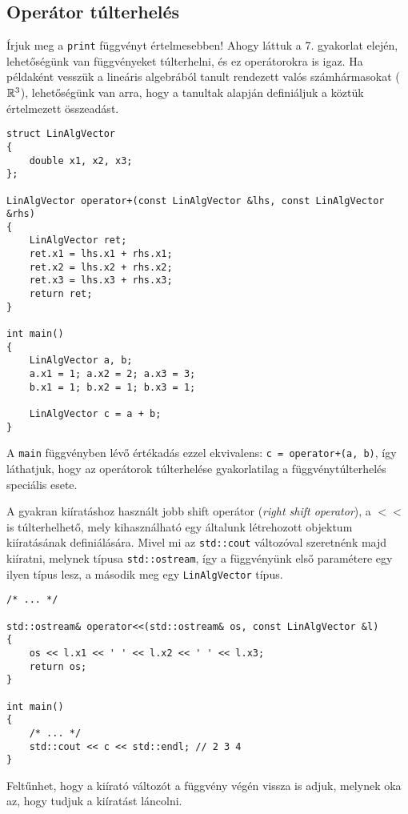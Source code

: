 \documentclass[a4paper,11.5pt]{article}
\begin{document}
	\subsection{Operátor túlterhelés}
	Írjuk meg a \texttt{print} függvényt értelmesebben! Ahogy láttuk a 7. gyakorlat elején, lehetőségünk van függvényeket túlterhelni, és ez operátorokra is igaz. Ha példaként vesszük a lineáris algebrából tanult rendezett valós számhármasokat ($\mathbb{R}^3$), lehetőségünk van arra, hogy a tanultak alapján definiáljuk a köztük értelmezett összeadást.
	\begin{lstlisting}
struct LinAlgVector
{
	double x1, x2, x3;
};

LinAlgVector operator+(const LinAlgVector &lhs, const LinAlgVector &rhs)
{
	LinAlgVector ret;
	ret.x1 = lhs.x1 + rhs.x1;
	ret.x2 = lhs.x2 + rhs.x2; 
	ret.x3 = lhs.x3 + rhs.x3;
	return ret;
}

int main()
{
	LinAlgVector a, b;
	a.x1 = 1; a.x2 = 2; a.x3 = 3;
	b.x1 = 1; b.x2 = 1; b.x3 = 1;
	
	LinAlgVector c = a + b; 
}
	\end{lstlisting}
	A \texttt{main} függvényben lévő értékadás ezzel ekvivalens: \texttt{c = operator+(a, b)}, így láthatjuk, hogy az operátorok túlterhelése gyakorlatilag a függvénytúlterhelés speciális esete. 
	\smallskip 
	
	A gyakran kiíratáshoz használt jobb shift operátor (\textit{right shift operator}), a $<<$ is túlterhelhető, mely kihasználható egy általunk létrehozott objektum kiíratásának definiálására. Mivel mi az \texttt{std::cout} változóval szeretnénk majd kiíratni, melynek típusa \texttt{std::ostream}, így a függvényünk első paramétere egy ilyen típus lesz, a második meg egy \texttt{LinAlgVector} típus.
	
	\begin{lstlisting}
/* ... */

std::ostream& operator<<(std::ostream& os, const LinAlgVector &l)
{
	os << l.x1 << ' ' << l.x2 << ' ' << l.x3;
	return os;
}

int main()
{
	/* ... */
	std::cout << c << std::endl; // 2 3 4
}
	\end{lstlisting}
	
	Feltűnhet, hogy a kiírató változót a függvény végén vissza is adjuk, melynek oka az, hogy tudjuk a kiíratást láncolni.
\end{document}

